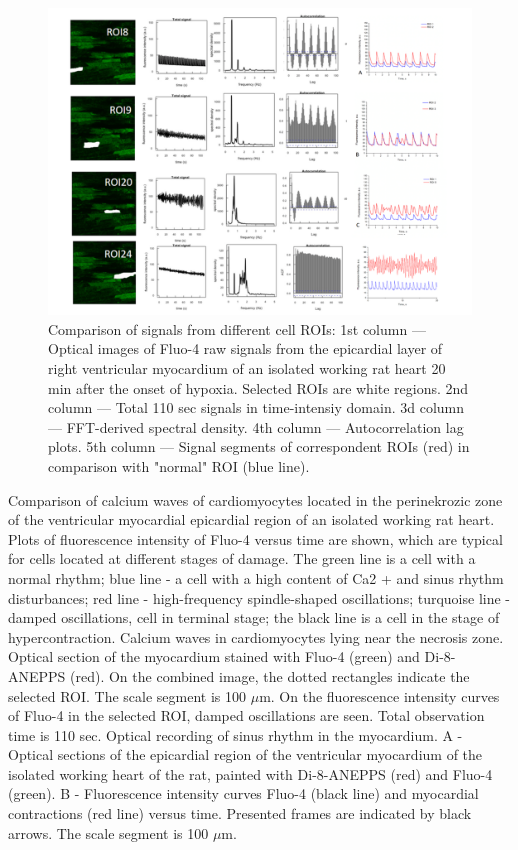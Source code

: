 \documentclass{biophys-new}
\begin{document}
\begin{figure}
    \includegraphics[width=0.9\linewidth]{fig5.png}
    \caption{Comparison of signals from different cell ROIs: 1st column --- Optical images of Fluo-4 raw signals from the epicardial layer of right ventricular myocardium of an isolated working rat heart 20 min after the onset of hypoxia. Selected ROIs are white regions. 2nd column --- Total 110 sec signals in time-intensiy domain. 3d column --- FFT-derived spectral density. 4th column --- Autocorrelation lag plots. 5th column --- Signal segments of correspondent ROIs (red) in comparison with "normal" ROI (blue line). }
    \label{fig:fig5}
\end{figure}



Comparison of calcium waves of cardiomyocytes located in the perinekrozic zone of the ventricular myocardial epicardial region of an isolated working rat heart.
Plots of fluorescence intensity of Fluo-4 versus time are shown, which are typical for cells located at different stages of damage.
The green line is a cell with a normal rhythm; blue line - a cell with a high content of Ca2 + and sinus rhythm disturbances; red line - high-frequency spindle-shaped oscillations; turquoise line - damped oscillations, cell in terminal stage; the black line is a cell in the stage of hypercontraction.
Calcium waves in cardiomyocytes lying near the necrosis zone.
Optical section of the myocardium stained with Fluo-4 (green) and Di-8-ANEPPS (red).
On the combined image, the dotted rectangles indicate the selected ROI.
The scale segment is 100 $\mu$m.
On the fluorescence intensity curves of Fluo-4 in the selected ROI, damped oscillations are seen.
Total observation time is 110 sec.
Optical recording of sinus rhythm in the myocardium.
A - Optical sections of the epicardial region of the ventricular myocardium of the isolated working heart of the rat, painted with Di-8-ANEPPS (red) and Fluo-4 (green). B - Fluorescence intensity curves Fluo-4 (black line) and myocardial contractions (red line) versus time. Presented frames are indicated by black arrows.
The scale segment is 100 $\mu$m.
\end{document}
